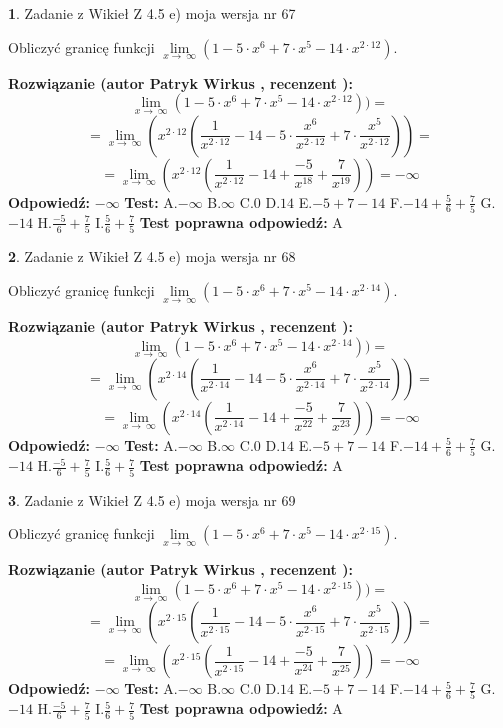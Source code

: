 \documentclass[12pt, a4paper]{article}
\theoremstyle{definition} %
\newtheorem{zad}{}
\newcommand{\zadStart}[1]{\begin{zad}#1\newline}
\newcommand{\zadStop}{\end{zad}}
\newcommand{\rozwStart}[2]{\noindent \textbf{Rozwiązanie (autor #1 , recenzent #2): }\newline}
\newcommand{\rozwStop}{\newline}
\newcommand{\odpStart}{\noindent \textbf{Odpowiedź:}\newline}
\newcommand{\odpStop}{\newline}
\newcommand{\testStart}{\noindent \textbf{Test:}\newline}
\newcommand{\testStop}{\newline}
\newcommand{\kluczStart}{\noindent \textbf{Test poprawna odpowiedź:}\newline}
\newcommand{\kluczStop}{\newline}
\begin{document}
\zadStart{Zadanie z Wikieł Z 4.5 e) moja wersja nr 67}



Obliczyć granicę funkcji  $\lim\limits_{x\to\ \infty}(1 - 5 \cdot x^{6}+7 \cdot x^{5}- 14 \cdot x^{2\cdot12})$.
\zadStop
\rozwStart{Patryk Wirkus}{}
$$\lim\limits_{x\to\ \infty}(1 - 5 \cdot x^{6}+7 \cdot x^{5}- 14 \cdot x^{2\cdot12}))=$$
$$=\lim\limits_{x\to\ \infty}(x^{2\cdot12}(\frac{1}{x^{2\cdot12}}-14 -5 \cdot \frac{x^{6}}{x^{2\cdot12}}+7 \cdot \frac{x^{5}}{x^{2\cdot12}}))=$$
$$=\lim\limits_{x\to\ \infty}(x^{2\cdot12}(\frac{1}{x^{2\cdot12}}-14 + \frac{-5}{x^{18}}+ \frac{7}{x^{19}}))=-\infty$$
\rozwStop
\odpStart
$-\infty$
\odpStop
\testStart
A.$-\infty$ B.$\infty$ C.$0$ D.$14$ E.$-5 + 7 - 14$
F.$-14+\frac{5}{6}+\frac{7}{5}$ G.$-14$
H.$\frac{-5}{6}+\frac{7}{5}$
I.$\frac{5}{6}+\frac{7}{5}$
\testStop
\kluczStart
A
\kluczStop



\zadStart{Zadanie z Wikieł Z 4.5 e) moja wersja nr 68}



Obliczyć granicę funkcji  $\lim\limits_{x\to\ \infty}(1 - 5 \cdot x^{6}+7 \cdot x^{5}- 14 \cdot x^{2\cdot14})$.
\zadStop
\rozwStart{Patryk Wirkus}{}
$$\lim\limits_{x\to\ \infty}(1 - 5 \cdot x^{6}+7 \cdot x^{5}- 14 \cdot x^{2\cdot14}))=$$
$$=\lim\limits_{x\to\ \infty}(x^{2\cdot14}(\frac{1}{x^{2\cdot14}}-14 -5 \cdot \frac{x^{6}}{x^{2\cdot14}}+7 \cdot \frac{x^{5}}{x^{2\cdot14}}))=$$
$$=\lim\limits_{x\to\ \infty}(x^{2\cdot14}(\frac{1}{x^{2\cdot14}}-14 + \frac{-5}{x^{22}}+ \frac{7}{x^{23}}))=-\infty$$
\rozwStop
\odpStart
$-\infty$
\odpStop
\testStart
A.$-\infty$ B.$\infty$ C.$0$ D.$14$ E.$-5 + 7 - 14$
F.$-14+\frac{5}{6}+\frac{7}{5}$ G.$-14$
H.$\frac{-5}{6}+\frac{7}{5}$
I.$\frac{5}{6}+\frac{7}{5}$
\testStop
\kluczStart
A
\kluczStop



\zadStart{Zadanie z Wikieł Z 4.5 e) moja wersja nr 69}



Obliczyć granicę funkcji  $\lim\limits_{x\to\ \infty}(1 - 5 \cdot x^{6}+7 \cdot x^{5}- 14 \cdot x^{2\cdot15})$.
\zadStop
\rozwStart{Patryk Wirkus}{}
$$\lim\limits_{x\to\ \infty}(1 - 5 \cdot x^{6}+7 \cdot x^{5}- 14 \cdot x^{2\cdot15}))=$$
$$=\lim\limits_{x\to\ \infty}(x^{2\cdot15}(\frac{1}{x^{2\cdot15}}-14 -5 \cdot \frac{x^{6}}{x^{2\cdot15}}+7 \cdot \frac{x^{5}}{x^{2\cdot15}}))=$$
$$=\lim\limits_{x\to\ \infty}(x^{2\cdot15}(\frac{1}{x^{2\cdot15}}-14 + \frac{-5}{x^{24}}+ \frac{7}{x^{25}}))=-\infty$$
\rozwStop
\odpStart
$-\infty$
\odpStop
\testStart
A.$-\infty$ B.$\infty$ C.$0$ D.$14$ E.$-5 + 7 - 14$
F.$-14+\frac{5}{6}+\frac{7}{5}$ G.$-14$
H.$\frac{-5}{6}+\frac{7}{5}$
I.$\frac{5}{6}+\frac{7}{5}$
\testStop
\kluczStart
A
\kluczStop
\end{document}
